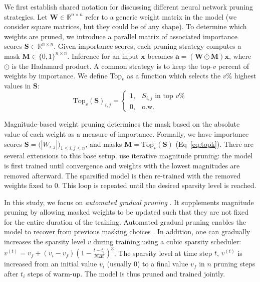 \documentclass{article}
\begin{document}
We first establish shared notation for discussing different neural network pruning strategies.  Let $\mathbf{W} \in \mathbb{R}^{n \times n}$ refer to a generic weight matrix in the model (we consider square matrices, but they could be of any shape). To determine which weights are pruned, we introduce a parallel matrix of associated importance scores $\mathbf{S} \in \mathbb{R}^{n \times n}$. Given importance scores, each pruning strategy computes a mask $\mathbf{M}\in \{0,1\}^{n \times n}$. Inference for an input $\mathbf{x}$ becomes $\mathbf{a} = (\mathbf{W} \odot \mathbf{M}) \mathbf{x}$, where $\odot$ is the Hadamard product.
A common strategy is to keep the top-$v$ percent of weights by importance. We define Top$_v$ as a function which selects the $v\%$ highest values in $\mathbf{S}$: 
\begin{equation}
\label{eq:topk}
\text{Top}_v(\mathbf{S})_{i,j}=
    \begin{cases}
      1, &  S_{i,j} \text{ in top } v\%  \\
      0, & \text{o.w.}
    \end{cases}
\end{equation}

Magnitude-based weight pruning determines the mask based on the absolute value of each weight as a measure of importance.
Formally, we have importance scores $\mathbf{S} = \big(|W_{i,j}|\big)_{1 \leq i,j \leq n}$, and masks $\mathbf{M} = \text{Top}_v(\mathbf{S})$ (Eq~\eqref{eq:topk}). There are several extensions to this base setup. \citet{Han2015LearningBW} use iterative magnitude pruning: the model is first trained until convergence and weights with the lowest magnitudes are removed afterward. The sparsified model is then re-trained with the removed weights fixed to 0. This loop is repeated until the desired sparsity level is reached.

In this study, we focus on \textit{automated gradual pruning} \citep{Zhu2018ToPO}. It supplements magnitude pruning by allowing masked weights to be updated such that they are not fixed for the entire duration of the training. Automated gradual pruning enables the model to recover from previous masking choices \citep{Guo2016DynamicNS}. In addition, one can gradually increases the sparsity level $v$ during training using a cubic sparsity scheduler: $v^{(t)} = v_f + (v_i - v_f)\left( 1-\frac{t-t_i}{N\Delta t} \right)^3$.
The sparsity level at time step $t$, $v^{(t)}$ is increased from an initial value $v_i$ (usually 0) to a final value $v_f$ in $n$ pruning steps after $t_i$ steps of warm-up. The model is thus pruned and trained jointly.
\end{document}
